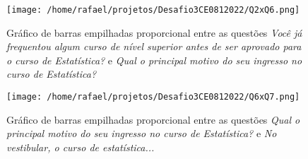 \documentclass[
        a4paper,
        11pt,
        extrafontsizes,
        oneside,
        onecolumn,
        openright,
        final,
        article,
        brazil,
        sumario=tradicional
]{abntex2}
\begin{document}
\begin{figure}[htp]
\centering
\texttt{[image: /home/rafael/projetos/Desafio3CE0812022/Q2xQ6.png]}
\caption{Gráfico de barras empilhadas proporcional entre as questões \emph{Você já frequentou algum curso de nível superior antes de ser aprovado para o curso de Estatística?} e \emph{Qual o principal motivo do seu ingresso no curso de Estatística?}}
\label{Q2xQ6}
\end{figure}

\begin{figure}[htp]
\centering
\texttt{[image: /home/rafael/projetos/Desafio3CE0812022/Q6xQ7.png]}
\caption{Gráfico de barras empilhadas proporcional entre as questões \emph{Qual o principal motivo do seu ingresso no curso de Estatística?} e \emph{No vestibular, o curso de estatística...}}
\label{Q6xQ7}
\end{figure}
\end{document}
